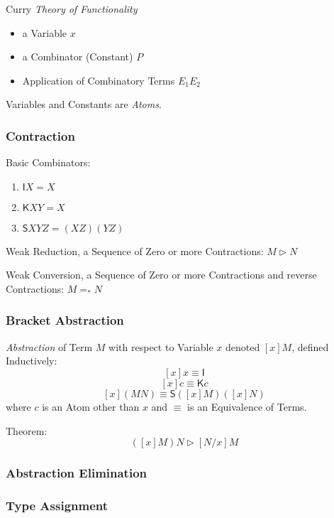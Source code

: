 Curry \emph{Theory of Functionality}

\begin{itemize}
  \item a Variable $x$
  \item a Combinator (Constant) $P$
  \item Application of Combinatory Terms $E_1 E_2$
\end{itemize}
Variables and Constants are \emph{Atoms}.



\subsubsection{Contraction}\label{sec:combinatory_contraction}
\cite{seldin03}

Basic Combinators:
\begin{enumerate}
  \item $\mathsf{I} X = X$
  \item $\mathsf{K} X Y = X$
  \item $\mathsf{S} X Y Z = (X Z) (Y Z)$
\end{enumerate}

Weak Reduction, a Sequence of Zero or more Contractions: $M \rhd N$

Weak Conversion, a Sequence of Zero or more Contractions and reverse
Contractions: $M =_* N$



\subsubsection{Bracket Abstraction}\label{sec:bracket_abstraction}

\emph{Abstraction} of Term $M$ with respect to Variable $x$ denoted
$[x]M$, defined Inductively:\cite{seldin03}
\[
  [x]x \equiv \mathsf{I}
\]\[
  [x]c \equiv \mathsf{K}c
\]\[
  [x](M N) \equiv \mathsf{S}([x]M)([x]N)
\]
where $c$ is an Atom other than $x$ and $\equiv$ is an Equivalence of
Terms.

Theorem:
\[
  ([x]M)N \rhd [N/x]M
\]



\subsubsection{Abstraction Elimination}
\label{sec:abstraction_elimination}



\subsubsection{Type Assignment}\label{sec:combinatory_type}
\cite{seldin03}

